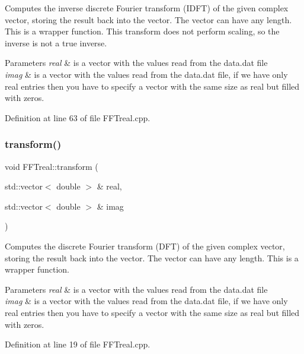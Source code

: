 Computes the inverse discrete Fourier transform (I\+D\+FT) of the given complex vector, storing the result back into the vector. The vector can have any length. This is a wrapper function. This transform does not perform scaling, so the inverse is not a true inverse. 


\begin{DoxyParams}{Parameters}
{\em real} & is a vector with the values read from the data.\+dat file \\
\hline
{\em imag} & is a vector with the values read from the data.\+dat file, if we have only real entries then you have to specify a vector with the same size as real but filled with zeros. \\
\hline
\end{DoxyParams}


Definition at line 63 of file F\+F\+Treal.\+cpp.

\mbox{\label{class_f_f_treal_a16caf75d31c313da4c6c1659497434c2}} 
\subsubsection{\texorpdfstring{transform()}{transform()}}
{\footnotesize\ttfamily void F\+F\+Treal\+::transform (\begin{DoxyParamCaption}\item[{std\+::vector$<$ double $>$ \&}]{real,  }\item[{std\+::vector$<$ double $>$ \&}]{imag }\end{DoxyParamCaption})}



Computes the discrete Fourier transform (D\+FT) of the given complex vector, storing the result back into the vector. The vector can have any length. This is a wrapper function. 


\begin{DoxyParams}{Parameters}
{\em real} & is a vector with the values read from the data.\+dat file \\
\hline
{\em imag} & is a vector with the values read from the data.\+dat file, if we have only real entries then you have to specify a vector with the same size as real but filled with zeros. \\
\hline
\end{DoxyParams}


Definition at line 19 of file F\+F\+Treal.\+cpp.

